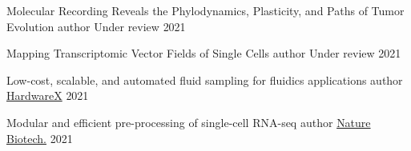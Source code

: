 

\begin{cvhonors}


  \cvhonor
    {Molecular Recording Reveals the Phylodynamics, Plasticity, and Paths of Tumor Evolution} %
    {author} %
    {Under review} %
    {2021} %

  \cvhonor
    {Mapping Transcriptomic Vector Fields of Single Cells} %
    {author} %
    {Under review} %
    {2021} %

  \cvhonor
    {Low-cost, scalable, and automated fluid sampling for fluidics applications} %
    {author} %
    {\href{https://doi.org/10.1016/j.ohx.2021.e00201}{HardwareX}} %
    {2021} %

  \cvhonor
    {Modular and efficient pre-processing of single-cell RNA-seq} %
    {author} %
    {\href{https://doi.org/10.1038/s41587-021-00870-2}{Nature Biotech.}} %
    {2021} %
\end{cvhonors}
